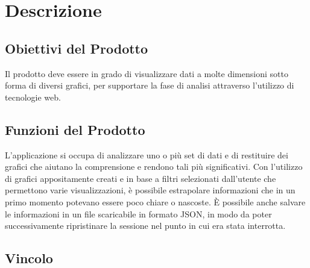 \chapter{Descrizione}

\section{Obiettivi del Prodotto}
Il prodotto deve essere in grado di visualizzare dati a molte dimensioni sotto forma di diversi grafici, per supportare la fase di analisi attraverso l'utilizzo di tecnologie web.

\section{Funzioni del Prodotto}
L'applicazione si occupa di analizzare uno o più set di dati e di restituire dei grafici che aiutano la comprensione e rendono tali più significativi.
Con l'utilizzo di grafici appositamente creati e in base a filtri selezionati dall'utente che permettono varie visualizzazioni, è possibile estrapolare informazioni che in un primo momento potevano essere poco chiare o nascoste.
È possibile anche salvare le informazioni in un file scaricabile in formato JSON, in modo da poter successivamente ripristinare la sessione nel punto in cui era stata interrotta.

\section{Vincolo}


